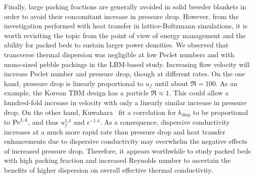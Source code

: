 Finally, large packing fractions are generally avoided in solid breeder blankets in order to avoid their concomitant increase in pressure drop. However, from the investigation performed with heat transfer in lattice-Boltzmann simulations, it is worth revisiting the topic from the point of view of energy management and the ability for packed beds to sustain larger power densities. We observed that transverse thermal dispersion was negligible at low Peclet numbers and with mono-sized pebble packings in the LBM-based study. Increasing flow velocity will increase Peclet number and pressure drop, though at different rates. On the one hand, pressure drop is linearly proportional to $u_f$ until about $\Re = 100$. As an example, the Korean TBM design has a particle $\Re \approx 1$. This could allow a hundred-fold increase in velocity with only a linearly similar increase in pressure drop. On the other hand, Kuwahara \etal~fit a correlation for $k_\text{disp}$ to be proportional to $\mathrm{Pe}^{1.4}$, and thus $u_f^{1.4}$ and $\epsilon^{-1.4}$. As a consequence, dispersive conductivity increases at a much more rapid rate than pressure drop and heat transfer enhancements due to dispersive conductivity may overwhelm the negative effects of increased pressure drop. Therefore, it appears worthwhile to study packed beds with high packing fraction and increased Reynolds number to ascertain the benefits of higher dispersion on overall effective thermal conductivity.
